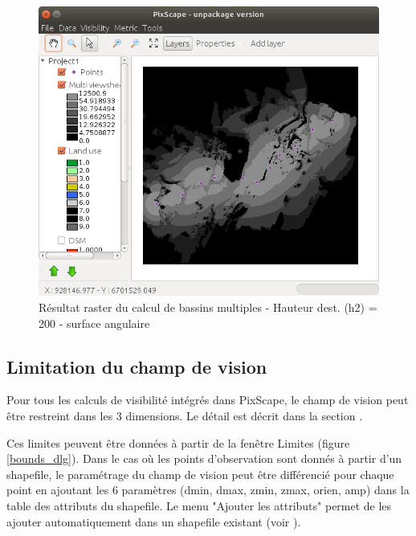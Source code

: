 \documentclass{report}
\begin{document}
\begin{figure}[H]
	\includegraphics[scale=0.5]{img/multi_viewshed_raster_deg-fr.png} 
	\caption{Résultat raster du calcul de bassins multiples - Hauteur dest. (h2) = 200 - surface angulaire}
	\label{multi_viewshed_raster_deg}
\end{figure}

\subsection{Limitation du champ de vision}
\label{bounds_ui}
Pour tous les calculs de visibilité intégrés dans PixScape, le champ de vision peut être restreint dans les 3 dimensions. Le détail est décrit dans la section .

Ces limites peuvent être données à partir de la fenêtre Limites (figure \ref{bounds_dlg}). Dans le cas où les points d'observation sont donnés à partir d'un shapefile, le paramétrage du champ de vision peut être différencié pour chaque point en ajoutant les 6 paramètres (dmin, dmax, zmin, zmax, orien, amp) dans la table des attributs du shapefile. Le menu "Ajouter les attributs" permet de les ajouter automatiquement dans un shapefile existant (voir ).
\end{document}
